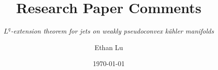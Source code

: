 \documentclass[lang=en,12pt,twoside]{textbook}
\begin{document}
\title{Research Paper Comments}
\subtitle{\textit{\texorpdfstring{$L^q$}{L square}-extension theorem for jets on weakly pseudoconvex k\"ahler manifolds}}
\author{Ethan Lu}
\date{\today}
\publishers{Textbook}

\begin{titlepage} %
\end{titlepage}
\end{document}
